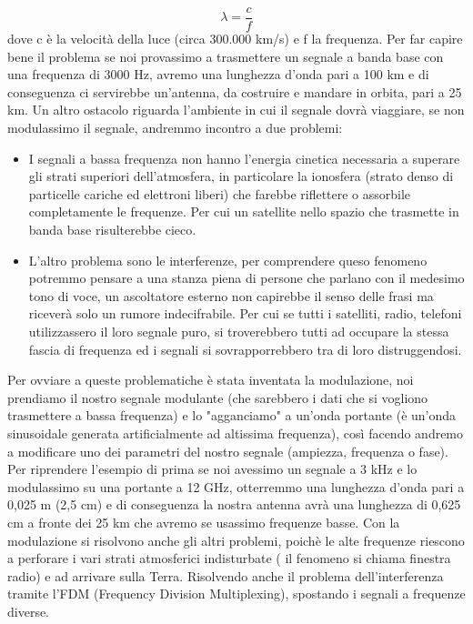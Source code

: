 \begin{equation}
    \lambda = \frac{c}{f}
\end{equation}
dove c è la velocità della luce (circa 300.000 km/s) e f la frequenza. 
Per far capire bene il problema se noi provassimo a trasmettere un segnale a banda base con una frequenza di 3000 Hz, avremo una lunghezza d'onda pari a 100 km e di conseguenza ci servirebbe un'antenna, da costruire e mandare in orbita, pari a 25 km. 
Un altro ostacolo riguarda l'ambiente in cui il segnale dovrà viaggiare, se non modulassimo il segnale, andremmo incontro a due problemi:
\begin{itemize}
    \item I segnali a bassa frequenza non hanno l'energia cinetica necessaria a superare gli strati superiori dell'atmosfera, in particolare la ionosfera (strato denso di particelle cariche ed elettroni liberi) che farebbe riflettere o assorbile completamente le frequenze. Per cui un satellite nello spazio che trasmette in banda base risulterebbe cieco. 
    \item L'altro problema sono le interferenze, per comprendere queso fenomeno potremmo pensare a una stanza piena di persone che parlano con il medesimo tono di voce, un ascoltatore esterno non capirebbe il senso delle frasi ma riceverà solo un rumore indecifrabile. Per cui se tutti i satelliti, radio, telefoni utilizzassero il loro segnale puro, si troverebbero tutti ad occupare la stessa fascia di frequenza ed i segnali si sovrapporrebbero tra di loro distruggendosi. 
\end{itemize}
Per ovviare a queste problematiche è stata inventata la modulazione, noi prendiamo il nostro segnale modulante (che sarebbero i dati che si vogliono trasmettere a bassa frequenza) e lo "agganciamo" a un'onda portante (è un'onda sinusoidale generata artificialmente ad altissima frequenza), così facendo andremo a modificare uno dei parametri del nostro segnale (ampiezza, frequenza o fase). Per riprendere l'esempio di prima se noi avessimo un segnale a 3 kHz e lo modulassimo su una portante a 12 GHz, otterremmo una lunghezza d'onda pari a 0,025 m (2,5 cm) e di conseguenza la nostra antenna avrà una lunghezza di 0,625 cm a fronte dei 25 km che avremo se usassimo frequenze basse. 
Con la modulazione si risolvono anche gli altri problemi, poichè le alte frequenze riescono a perforare i vari strati atmosferici indisturbate ( il fenomeno si chiama finestra radio) e ad arrivare sulla Terra. Risolvendo anche il problema dell'interferenza tramite l'FDM (Frequency Division Multiplexing), spostando i segnali a frequenze diverse. 
